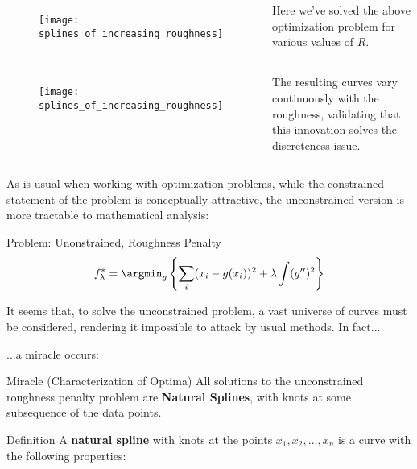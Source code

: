 %
%
\begin{frame}
  \begin{columns}
      \begin{figure}
        \texttt{[image: splines\_of\_increasing\_roughness]}
      \end{figure}
      Here we've solved the above optimization problem for various values of $R$.
  \end{columns}
\end{frame}
%
%
\begin{frame}
  \begin{columns}
      \begin{figure}
        \texttt{[image: splines\_of\_increasing\_roughness]}
      \end{figure}
      The resulting curves vary continuously with the roughness, validating that this innovation solves the discreteness issue.
  \end{columns}
\end{frame}
%
%
\begin{frame}
  As is usual when working with optimization problems, while the constrained statement of the problem is conceptually attractive, the unconstrained version is more tractable to mathematical analysis:
  \begin{block}{Problem: Unonstrained, Roughness Penalty}
    $$ f_{\lambda}^* = \argmin_{g} \left\{ \sum_i (x_i - g(x_i))^2 + \lambda \int (g'')^2 \right\} $$
  \end{block}
\end{frame}
%
%
\begin{frame}
  It seems that, to solve the unconstrained problem, a vast universe of curves must be considered, rendering it impossible to attack by usual methods.  In fact...
\end{frame}
%
%
\begin{frame}
  ...a miracle occurs:
  \begin{block}{Miracle (Characterization of Optima)}
    All solutions to the unconstrained roughness penalty problem are \textbf{Natural Splines},
with knots at some subsequence of the data points.
  \end{block}

\end{frame}
%
%
\begin{frame}
  \begin{block}{Definition}
    A \textbf{natural spline} with knots at the points $x_1, x_2, \ldots, x_n$ is a curve with the following properties:
  \end{block}
\end{frame}
